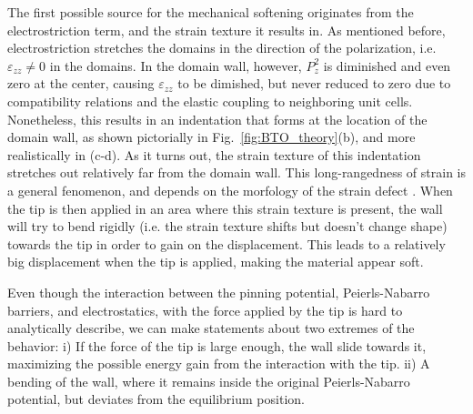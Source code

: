 The first possible source for the mechanical softening originates from the electrostriction term, and the strain texture it results in.
As mentioned before, electrostriction stretches the domains in the direction of the polarization, i.e. $\varepsilon_{zz} \neq 0$ in the domains.
In the domain wall, however, $P_z^2$ is diminished and even zero at the center, causing $\varepsilon_{zz}$ to be dimished, but never reduced to zero due to compatibility relations and the elastic coupling to neighboring unit cells.
Nonetheless, this results in an indentation that forms at the location of the domain wall, as shown pictorially in Fig.~\ref{fig:BTO_theory}(b), and more realistically in (c-d).
As it turns out, the strain texture of this indentation stretches out relatively far  from the domain wall.
This long-rangedness of strain is a general fenomenon, and depends on the morfology of the strain defect . When the tip is then applied in an area where this strain texture is present, the wall will try to bend rigidly (i.e. the strain texture shifts but doesn't change shape) towards the tip in order to gain on the displacement.
This leads to a relatively big displacement when the tip is applied, making the material appear soft.

Even though the interaction between the pinning potential, Peierls-Nabarro barriers, and electrostatics, with the force applied by the tip is hard to analytically describe, we can make statements about two extremes of the behavior: i) If the force of the tip is large enough, the wall slide towards it, maximizing the possible energy gain from the interaction with the tip.
ii) A bending of the wall, where it remains inside the original Peierls-Nabarro potential, but deviates from  the equilibrium position.


